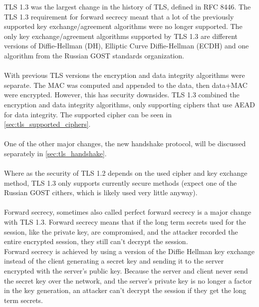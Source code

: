 TLS 1.3 was the largest change in the history of TLS, defined in RFC 8446. The TLS 1.3 requirement for forward secrecy meant that a lot of the previously supported key exchange/agreement algorithms were no longer supported. The only key exchange/agreement algorithms supported by TLS 1.3 are different versions of Diffie-Hellman (DH), Elliptic Curve Diffie-Hellman (ECDH) and one algorithm from the Russian GOST standards organization. 
\\\\
With previous TLS versions the encryption and data integrity algorithms were separate. The MAC was computed and appended to the data, then data+MAC were encrypted. However, this has security downsides. TLS 1.3 combined the encryption and data integrity algorithms, only supporting ciphers that use AEAD for data integrity. The supported cipher can be seen in \ref{sec:tls_supported_ciphers}.
\\\\
One of the other major changes, the new handshake protocol, will be discussed separately in \ref{sec:tls_handshake}.
\\\\
Where as the security of TLS 1.2 depends on the used cipher and key exchange method, TLS 1.3 only supports currently secure methods (expect one of the Russian GOST cithers, which is likely used very little anyway).
\\\\
Forward secrecy, sometimes also called perfect forward secrecy is a major change with TLS 1.3. Forward secrecy means that if the long term secrets used for the session, like the private key, are compromised, and the attacker recorded the entire encrypted session, they still can't decrypt the session.
\\
Forward secrecy is achieved by using a version of the Diffie Hellman key exchange instead of the client generating a secret key and sending it to the server encrypted with the server's public key. Because the server and client never send the secret key over the network, and the server's private key is no longer a factor in the key generation, an attacker can't decrypt the session if they get the long term secrets.